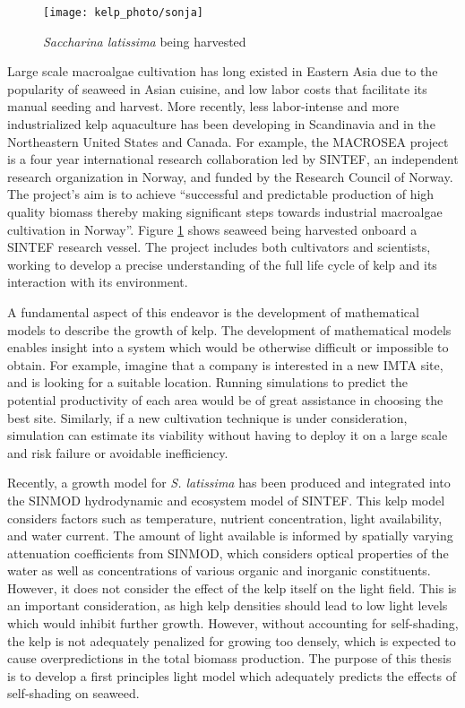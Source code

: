 \begin{figure}[h]
  \centering
  \texttt{[image: kelp\_photo/sonja]}
  \caption{\textit{Saccharina latissima} being harvested}
  \label{fig:sonja}
\end{figure}

Large scale macroalgae cultivation has long existed in Eastern Asia due to the popularity of seaweed in Asian cuisine, and low labor costs that facilitate its manual seeding and harvest.
  More recently, less labor-intense and more industrialized kelp aquaculture has been developing in Scandinavia and in the Northeastern United States and Canada.
  For example, the MACROSEA project is a four year international research collaboration led by SINTEF, an independent research organization in Norway, and funded by the Research Council of Norway.
  The project's aim is to achieve ``successful and predictable production of high quality biomass thereby making significant steps towards industrial macroalgae cultivation in Norway''.
Figure \ref{fig:sonja} shows seaweed being harvested onboard a SINTEF research vessel.
The project includes both cultivators and scientists, working to develop a precise understanding of the full life cycle of kelp and its interaction with its environment.

A fundamental aspect of this endeavor is the development of mathematical models to describe the growth of kelp.
The development of mathematical models enables insight into a system which would be otherwise difficult or impossible to obtain.
For example, imagine that a company is interested in a new IMTA site, and is looking for a suitable location.
Running simulations to predict the potential productivity of each area would be of great assistance in choosing the best site.
Similarly, if a new cultivation technique is under consideration, simulation can estimate its viability without
having to deploy it on a large scale and risk failure or avoidable inefficiency.

Recently, a growth model \cite{broch_modelling_2012} for \textit{S. latissima} has been produced and integrated into the SINMOD \cite{wassmann_modelling_2006} hydrodynamic and ecosystem model of SINTEF.
This kelp model considers factors such as temperature, nutrient concentration, light availability, and water current.
The amount of light available is informed by spatially varying attenuation coefficients from SINMOD,
which considers optical properties of the water as well as concentrations of various organic and inorganic constituents.
However, it does not consider the effect of the kelp itself on the light field.
This is an important consideration, as high kelp densities should lead to low light levels which would inhibit further growth.
However, without accounting for self-shading, the kelp is not adequately penalized for growing too densely,
which is expected to cause overpredictions in the total biomass production.
The purpose of this thesis is to develop a first principles light model which adequately predicts the effects of self-shading on seaweed.


